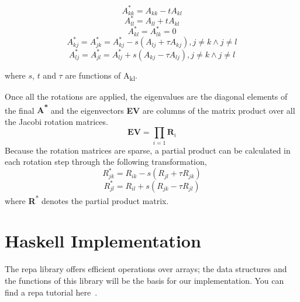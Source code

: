 \documentclass{tmr}
\begin{document}
\begin{equation}\label{1} A^{*}_{kk} = A_{kk}  -  t A_{kl} \end{equation}
\begin{equation}\label{2} A^{*}_{ll} = A_{ll} +   t A_{kl} \end{equation}
\begin{equation}\label{3} A^{*}_{kl} =A^{*}_{lk} = 0       \end{equation}
\begin{equation}\label{4}
A^{*}_{kj} =A^{*}_{jk} = A^{*}_{kj} - s (A_{lj} + \tau A_{kj}), j \not = k \wedge j \not = l 
\end{equation}
\begin{equation}\label{5}
A^{*}_{lj} =A^{*}_{jl} = A^{*}_{lj} + s (A_{kj} - \tau A_{lj}), j \not = k \wedge j \not = l 
\end{equation}

where $s$, $t$ and $\tau$ are functions of A\textsubscript{kl}.

Once all the rotations are applied, the eigenvalues are the diagonal
elements of the final \textbf{A\textsuperscript{*}} and the eigenvectors
{\bf EV} are columns of the matrix product over all the Jacobi rotation
matrices.
%
\[ \mathbf{EV} = \prod_{i=1} \mathbf{R}_i \]
%
Because the rotation matrices are sparse, a partial product can be
calculated in each rotation step through the following transformation,
%
\begin{equation}\label{6} R^{*}_{jk} = R_{ik}  -  s (R_{jl} + \tau R_{jk}) \end{equation}
\begin{equation}\label{7} R^{*}_{jl} = R_{il}  +  s (R_{jk} - \tau R_{jl}) \end{equation}
%
where {\textbf R\textsuperscript{*}} denotes the partial product matrix.

\section{Haskell Implementation}

The repa library offers efficient operations over arrays; the data
structures and the functions of this library will be the basis for our
implementation.
%
You can find a repa tutorial here~\cite{repa}.
\end{document}
